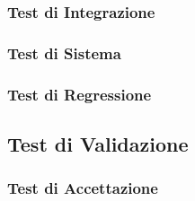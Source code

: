 		\subsubsection{Test di Integrazione}	
		\subsubsection{Test di Sistema}	
		\subsubsection{Test di Regressione}	
	
	
	
	\subsection{Test di Validazione}
		\subsubsection{Test di Accettazione}	

